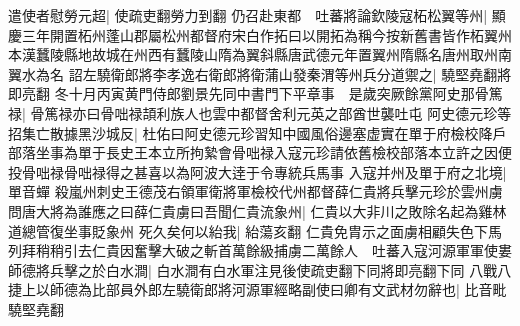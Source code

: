 遣使者慰勞元超|{
	使疏吏翻勞力到翻}
仍召赴東都　吐蕃將論欽陵寇柘松翼等州|{
	顯慶三年開置柘州蓬山郡屬松州都督府宋白作拓曰以開拓為稱今按新舊書皆作柘翼州本漢蠶陵縣地故城在州西有蠶陵山隋為翼斜縣唐武德元年置翼州隋縣名唐州取州南翼水為名}
詔左驍衛郎將李孝逸右衛郎將衛蒲山發秦渭等州兵分道禦之|{
	驍堅堯翻將即亮翻}
冬十月丙寅黄門侍郎劉景先同中書門下平章事　是歲突厥餘黨阿史那骨篤禄|{
	骨篤禄亦曰骨咄禄頡利族人也雲中都督舍利元英之部酋世襲吐屯}
阿史德元珍等招集亡散據黑沙城反|{
	杜佑曰阿史德元珍習知中國風俗邊塞虚實在單于府檢校降戶部落坐事為單于長史王本立所拘縶會骨咄禄入寇元珍請依舊檢校部落本立許之因便投骨咄禄骨咄禄得之甚喜以為阿波大逹于令專統兵馬事}
入寇并州及單于府之北境|{
	單音蟬}
殺嵐州刺史王德茂右領軍衛將軍檢校代州都督薛仁貴將兵擊元珍於雲州虜問唐大將為誰應之曰薛仁貴虜曰吾聞仁貴流象州|{
	仁貴以大非川之敗除名起為雞林道總管復坐事貶象州}
死久矣何以紿我|{
	紿蕩亥翻}
仁貴免胄示之面虜相顧失色下馬列拜稍稍引去仁貴因奮擊大破之斬首萬餘級捕虜二萬餘人　吐蕃入寇河源軍軍使婁師德將兵擊之於白水澗|{
	白水澗有白水軍注見後使疏吏翻下同將即亮翻下同}
八戰八捷上以師德為比部員外郎左驍衛郎將河源軍經略副使曰卿有文武材勿辭也|{
	比音毗驍堅堯翻}


